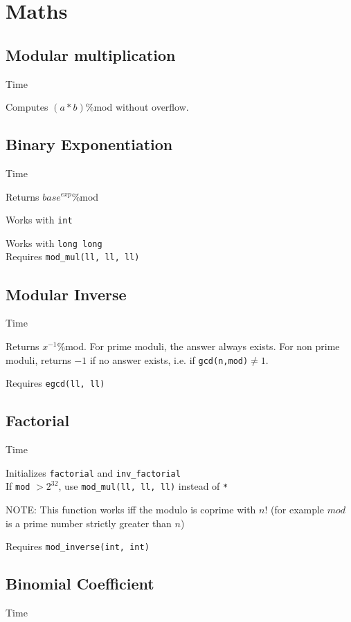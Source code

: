 \section{Maths}


\subsection{Modular multiplication}
 Time

Computes $(a * b)$\:\%\:mod without overflow.


\subsection{Binary Exponentiation}
 Time

Returns ${base^{exp}}$\:\%\:mod

Works with \verb|int|

Works with \verb|long long| \\
Requires \verb|mod_mul(ll, ll, ll)|


\subsection{Modular Inverse}
 Time

Returns ${x^{-1}}$\:\%\:mod. For prime moduli, the answer always exists. For non prime moduli, returns $-1$ if no answer exists, i.e. if \verb|gcd(n,mod)|$ \neq 1$.

Requires \verb|egcd(ll, ll)|


\subsection{Factorial}
 Time

Initializes \verb|factorial| and \verb|inv_factorial| \\
If \verb|mod| $> 2^{32}$, use \verb|mod_mul(ll, ll, ll)| instead of \verb|*|

NOTE: This function works iff the modulo is coprime with $n!$
(for example $mod$ is a prime number strictly greater than $n$)

Requires \verb|mod_inverse(int, int)|


\subsection{Binomial Coefficient}
 Time

